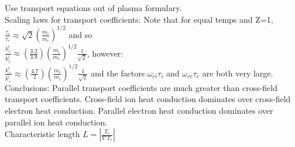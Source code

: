 \documentclass[10pt]{extarticle}
\begin{document}
\begin{multicols}{3}
Use transport equations out of plasma formulary.\\
Scaling laws for transport coefficients:  Note that for equal temps and Z=1,\\
$\frac{\tau_{i}}{\tau_{e}} \approx \sqrt{2} (\frac{m_{i}}{m_{e}})^{1/2}$ 
and so\\ 
$\frac{k_{||}^{e}}{k_{||}^{i}} \approx (\frac{3.2}{3.9})(\frac{m_{i}}{m_{e}})^{1/2} \frac{1}{\sqrt{2}}$, however:\\
$\frac{k_{\perp}^{e}}{k_{\perp}^{i}} \approx (\frac{4.7}{2})(\frac{m_{e}}{m_{i}})^{1/2} \frac{1}{\sqrt{2}}$ and the factors $\omega_{ci}\tau_{i}$ and $\omega_{ce}\tau_{e}$ are both very large.  Conclusions: Parallel transport coefficients are much greater than cross-field transport coefficients. Cross-field ion heat conduction dominates over cross-field electron heat conduction.  Parallel electron heat conduction dominates over parallel ion heat conduction.\\
Characteristic length $L = |\frac{T_{e}}{\nabla T_{e}}|$\\


\end{multicols}
\end{document}

